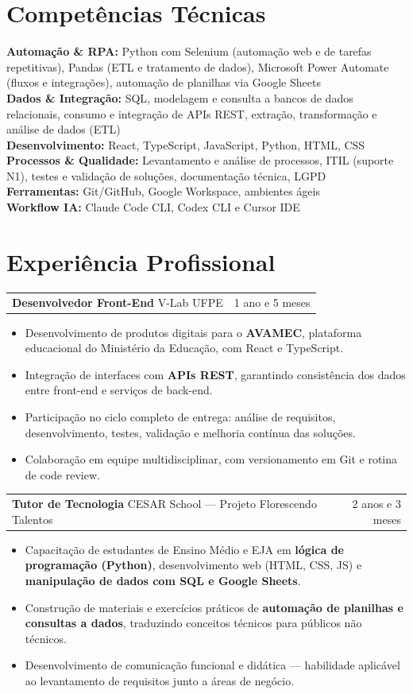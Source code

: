 \documentclass[a4paper,10.5pt]{article}
\makeatletter
\newcommand{\cargo}[3]{%
  \vspace{2pt}
  \begin{tabularx}{\textwidth}{@{}Xr@{}}
    \textbf{#1} \textnormal{\textbar{} #2} & \textcolor{muted}{#3}
  \end{tabularx}%
  \vspace{1pt}
}
\newcommand{\skillline}[2]{\textbf{#1:} #2\\}
\makeatother
\begin{document}
\section{Competências Técnicas}
\skillline{Automação \& RPA}{Python com Selenium (automação web e de tarefas repetitivas), Pandas (ETL e tratamento de dados), Microsoft Power Automate (fluxos e integrações), automação de planilhas via Google Sheets}
\skillline{Dados \& Integração}{SQL, modelagem e consulta a bancos de dados relacionais, consumo e integração de APIs REST, extração, transformação e análise de dados (ETL)}
\skillline{Desenvolvimento}{React, TypeScript, JavaScript, Python, HTML, CSS}
\skillline{Processos \& Qualidade}{Levantamento e análise de processos, ITIL (suporte N1), testes e validação de soluções, documentação técnica, LGPD}
\skillline{Ferramentas}{Git/GitHub, Google Workspace, ambientes ágeis}
\skillline{Workflow IA}{Claude Code CLI, Codex CLI e Cursor IDE}


\vspace{-1.5em}
\section{Experiência Profissional}

\cargo{Desenvolvedor Front-End}{V-Lab UFPE}{1 ano e 5 meses}
\begin{itemize}
  \item Desenvolvimento de produtos digitais para o \textbf{AVAMEC}, plataforma educacional do Ministério da Educação, com React e TypeScript.
  \item Integração de interfaces com \textbf{APIs REST}, garantindo consistência dos dados entre front-end e serviços de back-end.
  \item Participação no ciclo completo de entrega: análise de requisitos, desenvolvimento, testes, validação e melhoria contínua das soluções.
  \item Colaboração em equipe multidisciplinar, com versionamento em Git e rotina de code review.
\end{itemize}

\cargo{Tutor de Tecnologia}{CESAR School --- Projeto Florescendo Talentos}{2 anos e 3 meses}
\begin{itemize}
  \item Capacitação de estudantes de Ensino Médio e EJA em \textbf{lógica de programação (Python)}, desenvolvimento web (HTML, CSS, JS) e \textbf{manipulação de dados com SQL e Google Sheets}.
  \item Construção de materiais e exercícios práticos de \textbf{automação de planilhas e consultas a dados}, traduzindo conceitos técnicos para públicos não técnicos.
  \item Desenvolvimento de comunicação funcional e didática --- habilidade aplicável ao levantamento de requisitos junto a áreas de negócio.
\end{itemize}
\end{document}
